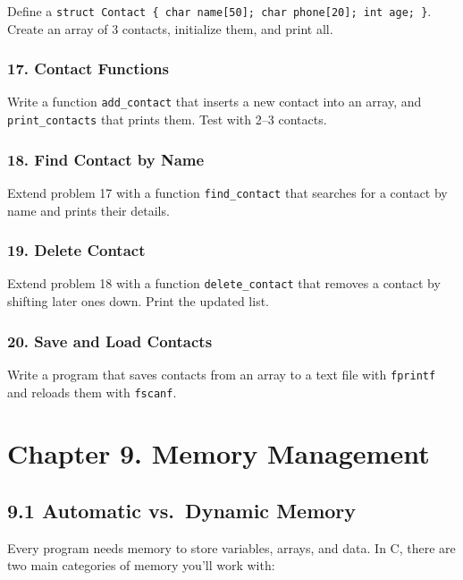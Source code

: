 \documentclass[
  letterpaper,
  DIV=11,
  numbers=noendperiod]{scrreprt}
\begin{document}
Define a
\texttt{struct\ Contact\ \{\ char\ name{[}50{]};\ char\ phone{[}20{]};\ int\ age;\ \}}.
Create an array of 3 contacts, initialize them, and print all.

\subsubsection{17. Contact Functions}\label{contact-functions}

Write a function \texttt{add\_contact} that inserts a new contact into
an array, and \texttt{print\_contacts} that prints them. Test with 2--3
contacts.

\subsubsection{18. Find Contact by Name}\label{find-contact-by-name}

Extend problem 17 with a function \texttt{find\_contact} that searches
for a contact by name and prints their details.

\subsubsection{19. Delete Contact}\label{delete-contact}

Extend problem 18 with a function \texttt{delete\_contact} that removes
a contact by shifting later ones down. Print the updated list.

\subsubsection{20. Save and Load Contacts}\label{save-and-load-contacts}

Write a program that saves contacts from an array to a text file with
\texttt{fprintf} and reloads them with \texttt{fscanf}.

\section{Chapter 9. Memory
Management}\label{chapter-9.-memory-management}

\subsection{9.1 Automatic vs.~Dynamic
Memory}\label{automatic-vs.-dynamic-memory}

Every program needs memory to store variables, arrays, and data. In C,
there are two main categories of memory you'll work with:
\end{document}
